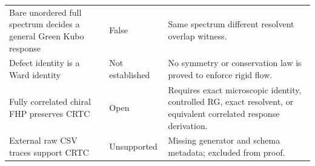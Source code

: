 \begin{longtable}{p{}p{}p{}}
Bare unordered full spectrum decides a general Green Kubo response & False & Same spectrum different resolvent overlap witness.\\
Defect identity is a Ward identity & Not established & No symmetry or conservation law is proved to enforce rigid flow.\\
Fully correlated chiral FHP preserves CRTC & Open & Requires exact microscopic identity, controlled RG, exact resolvent, or equivalent correlated response derivation.\\
External raw CSV traces support CRTC & Unsupported & Missing generator and schema metadata; excluded from proof.\\
\bottomrule
\end{longtable}
